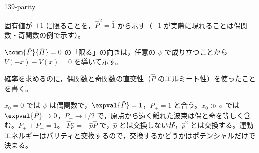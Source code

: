 \documentclass[uplatex,dvipdfmx,a4paper,11pt]{jsarticle}
\begin{document}
\begin{kaisetsu}{139-parity}
\begin{ronten}
  \item {} 固有値が $\pm1$ に限ることを，$\hat{P}^{2}=\hat{1}$ から示す（$\pm1$ が実際に現れることは偶関数・奇関数の例で示す）。
  \item {} $\comm{\hat{P}}{\hat{H}}=0$ の「限る」の向きは，任意の $\psi$ で成り立つことから $V(-x)-V(x)=0$ を導いて示す。
  \item {} 確率を求めるのに，偶関数と奇関数の直交性（$\hat{P}$ のエルミート性）を使ったことを書く。
\end{ronten}
\kenzan $x_{0}=0$ では $\psi$ は偶関数で，$\expval{\hat{P}}=1$，$P_{+}=1$ と合う。$x_{0}\gg\sigma$ では $\expval{\hat{P}}\to0$，$P_{\pm}\to1/2$ で，原点から遠く離れた波束は偶と奇を等しく含む。$P_{+}+P_{-}=1$。
\tsumazuki $\hat{P}\hat{p}=-\hat{p}\hat{P}$ で，$\hat{p}$ とは交換しないが，$\hat{p}^{2}$ とは交換する。運動エネルギーはパリティと交換するので，交換するかどうかはポテンシャルだけで決まる。
\end{kaisetsu}
\end{document}
